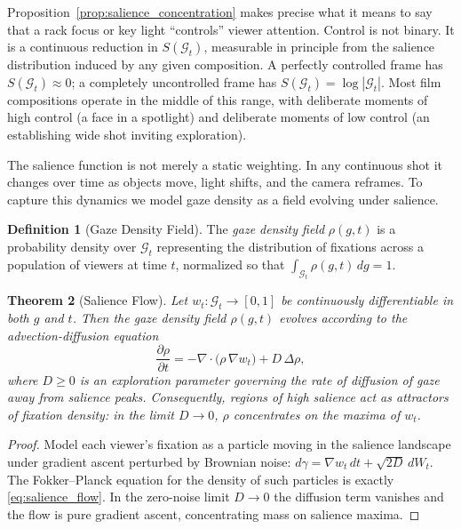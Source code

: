 \documentclass[12pt, a4paper]{article}
\theoremstyle{plain}
\newtheorem{theorem}{Theorem}[section]
\theoremstyle{definition}
\newtheorem{definition}[theorem]{Definition}
\theoremstyle{remark}
\newcommand{\G}{\mathcal{G}}
\newcommand{\traj}{\gamma}
\newcommand{\salience}{w}
\begin{document}
Proposition~\ref{prop:salience_concentration} makes precise
what it means to say that a rack focus or key light
``controls'' viewer attention. Control is not binary. It
is a continuous reduction in $S(\G_t)$, measurable in
principle from the salience distribution induced by any
given composition. A perfectly controlled frame has
$S(\G_t) \approx 0$; a completely uncontrolled frame has
$S(\G_t) = \log |\G_t|$. Most film compositions operate
in the middle of this range, with deliberate moments of
high control (a face in a spotlight) and deliberate moments
of low control (an establishing wide shot inviting
exploration).

The salience function is not merely a static weighting. In
any continuous shot it changes over time as objects move,
light shifts, and the camera reframes. To capture this
dynamics we model gaze density as a field evolving under
salience.

\begin{definition}[Gaze Density Field]
  The \emph{gaze density field} $\rho(g, t)$ is a
  probability density over $\G_t$ representing the
  distribution of fixations across a population of viewers
  at time $t$, normalized so that
  $\int_{\G_t} \rho(g,t)\, dg = 1$.
\end{definition}

\begin{theorem}[Salience Flow]
\label{thm:salience_flow}
  Let $\salience_t : \G_t \to [0,1]$ be continuously
  differentiable in both $g$ and $t$. Then the gaze density
  field $\rho(g,t)$ evolves according to the
  advection-diffusion equation
  \begin{equation}
    \frac{\partial \rho}{\partial t}
    = -\nabla \cdot \bigl(\rho\, \nabla \salience_t\bigr)
      + D\,\Delta\rho,
    \label{eq:salience_flow}
  \end{equation}
  where $D \geq 0$ is an exploration parameter governing
  the rate of diffusion of gaze away from salience peaks.
  Consequently, regions of high salience act as attractors
  of fixation density: in the limit $D \to 0$, $\rho$
  concentrates on the maxima of $\salience_t$.
\end{theorem}

\begin{proof}
  Model each viewer's fixation as a particle moving in the
  salience landscape under gradient ascent perturbed by
  Brownian noise: $d\traj = \nabla \salience_t\, dt +
  \sqrt{2D}\, dW_t$. The Fokker--Planck equation for the
  density of such particles is exactly
  \eqref{eq:salience_flow}. In the zero-noise limit
  $D \to 0$ the diffusion term vanishes and the flow is
  pure gradient ascent, concentrating mass on salience
  maxima.
\end{proof}
\end{document}
